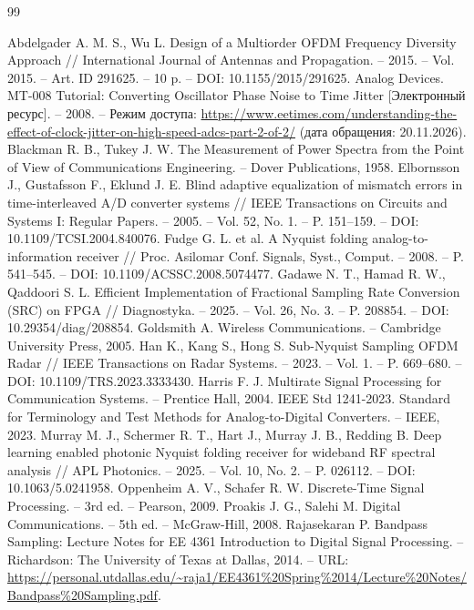 \documentclass[a4paper,12pt]{article}
\numberwithin{equation}{section}
\begin{document}
\begin{thebibliography}{99}

Abdelgader A. M. S., Wu L. Design of a Multiorder OFDM Frequency Diversity Approach // International Journal of Antennas and Propagation. -- 2015. -- Vol. 2015. -- Art. ID 291625. -- 10 p. -- DOI: 10.1155/2015/291625.
Analog Devices. MT-008 Tutorial: Converting Oscillator Phase Noise to Time Jitter [Электронный ресурс]. -- 2008. -- Режим доступа: \url{https://www.eetimes.com/understanding-the-effect-of-clock-jitter-on-high-speed-adcs-part-2-of-2/} (дата обращения: 20.11.2026).
Blackman R. B., Tukey J. W. The Measurement of Power Spectra from the Point of View of Communications Engineering. -- Dover Publications, 1958.
Elbornsson J., Gustafsson F., Eklund J. E. Blind adaptive equalization of mismatch errors in time-interleaved A/D converter systems // IEEE Transactions on Circuits and Systems I: Regular Papers. -- 2005. -- Vol. 52, No. 1. -- P. 151--159. -- DOI: 10.1109/TCSI.2004.840076.
Fudge G. L. et al. A Nyquist folding analog-to-information receiver // Proc. Asilomar Conf. Signals, Syst., Comput. -- 2008. -- P. 541--545. -- DOI: 10.1109/ACSSC.2008.5074477.
Gadawe N. T., Hamad R. W., Qaddoori S. L. Efficient Implementation of Fractional Sampling Rate Conversion (SRC) on FPGA // Diagnostyka. -- 2025. -- Vol. 26, No. 3. -- P. 208854. -- DOI: 10.29354/diag/208854.
Goldsmith A. Wireless Communications. -- Cambridge University Press, 2005.
Han K., Kang S., Hong S. Sub-Nyquist Sampling OFDM Radar // IEEE Transactions on Radar Systems. -- 2023. -- Vol. 1. -- P. 669--680. -- DOI: 10.1109/TRS.2023.3333430.
Harris F. J. Multirate Signal Processing for Communication Systems. -- Prentice Hall, 2004.
IEEE Std 1241-2023. Standard for Terminology and Test Methods for Analog-to-Digital Converters. -- IEEE, 2023.
Murray M. J., Schermer R. T., Hart J., Murray J. B., Redding B. Deep learning enabled photonic Nyquist folding receiver for wideband RF spectral analysis // APL Photonics. -- 2025. -- Vol. 10, No. 2. -- P. 026112. -- DOI: 10.1063/5.0241958.
Oppenheim A. V., Schafer R. W. Discrete-Time Signal Processing. -- 3rd ed. -- Pearson, 2009.
Proakis J. G., Salehi M. Digital Communications. -- 5th ed. -- McGraw-Hill, 2008.
Rajasekaran P. Bandpass Sampling: Lecture Notes for EE 4361 Introduction to Digital Signal Processing. -- Richardson: The University of Texas at Dallas, 2014. -- URL: \url{https://personal.utdallas.edu/~raja1/EE4361\%20Spring\%2014/Lecture\%20Notes/Bandpass\%20Sampling.pdf}.

\end{thebibliography}
\end{document}
